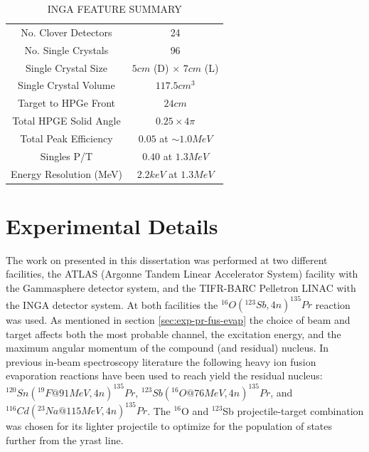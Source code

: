 \begin{table}[h]
\caption{INGA FEATURE SUMMARY\label{tbl:inga-summary}}
\begin{center}
\begin{tabular}{|c|c|}
\hline
\hline
No. Clover Detectors      & 24\\ 
No. Single Crystals       & 96\\ 
Single Crystal Size       & $5 cm$ (D) $\times$ $7 cm$ (L) \\
Single Crystal Volume     & $117.5 cm^3$\\
Target to HPGe Front      & $24 cm$\\ 
Total HPGE Solid Angle    & $0.25 \times 4\pi$\\ 
Total Peak Efficiency     & $0.05$ at $\sim1.0 MeV$\\ 
Singles P/T               & $0.40$ at $1.3 MeV$ \\ 
Energy Resolution (MeV)   & $2.2keV$ at $1.3 MeV$ \\ 
\hline 
\hline 
\end{tabular}
\end{center}
\end{table}

\section{Experimental Details}
\label{sec:exp-pr-details}
The work on \pr{} presented in this dissertation was performed at two different facilities, the ATLAS (Argonne Tandem Linear Accelerator System) facility with the Gammasphere detector system, and the TIFR-BARC Pelletron LINAC with the INGA detector system. At both facilities the $^{16}O(^{123}Sb,4n)^{135}Pr$ reaction was used. As mentioned in section \ref{sec:exp-pr-fus-evap} the choice of beam and target affects both the most probable channel, the excitation energy, and the maximum angular momentum of the compound (and residual) nucleus. In previous in-beam \gr{} spectroscopy literature the following heavy ion fusion evaporation reactions have been used to reach yield the \pr{} residual nucleus: $^{120}Sn(^{19}F @ 91MeV,4n)^{135}Pr$\cite{Semkow135Pr}, $^{123}Sb(^{16}O @ 76MeV,4n)^{135}Pr$\cite{135PrLifetimes}, and  $^{116}Cd(^{23}Na @ 115MeV,4n)^{135}Pr$\cite{EPaul135Pr}. The $^{16}$O and $^{123}$Sb projectile-target combination was chosen for its lighter projectile to optimize for the population of states further from the yrast line.

